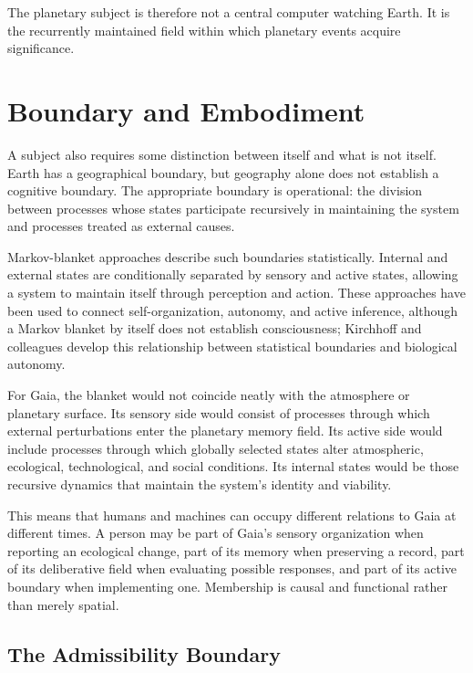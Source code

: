 \documentclass[11pt]{article}
\begin{document}
The planetary subject is therefore not a central computer watching Earth. It is the recurrently maintained field within which planetary events acquire significance.

\section{Boundary and Embodiment}
\label{sec:boundary}

A subject also requires some distinction between itself and what is not itself. Earth has a geographical boundary, but geography alone does not establish a cognitive boundary. The appropriate boundary is operational: the division between processes whose states participate recursively in maintaining the system and processes treated as external causes.

Markov-blanket approaches describe such boundaries statistically. Internal and external states are conditionally separated by sensory and active states, allowing a system to maintain itself through perception and action. These approaches have been used to connect self-organization, autonomy, and active inference, although a Markov blanket by itself does not establish consciousness; Kirchhoff and colleagues develop this relationship between statistical boundaries and biological autonomy.

For Gaia, the blanket would not coincide neatly with the atmosphere or planetary surface. Its sensory side would consist of processes through which external perturbations enter the planetary memory field. Its active side would include processes through which globally selected states alter atmospheric, ecological, technological, and social conditions. Its internal states would be those recursive dynamics that maintain the system's identity and viability.

This means that humans and machines can occupy different relations to Gaia at different times. A person may be part of Gaia's sensory organization when reporting an ecological change, part of its memory when preserving a record, part of its deliberative field when evaluating possible responses, and part of its active boundary when implementing one. Membership is causal and functional rather than merely spatial.

\subsection{The Admissibility Boundary}
\label{sec:admissibility}
\end{document}
